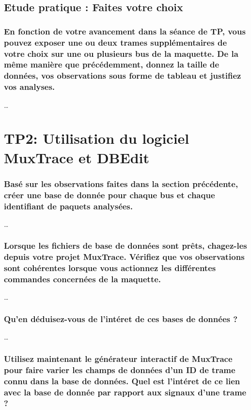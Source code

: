 \documentclass{rapportECC}
\begin{document}
\subsection{Etude pratique : Faites votre choix}

\subsubsection*{En fonction de votre avancement dans la séance de TP, vous pouvez exposer une ou deux trames supplémentaires de votre choix sur une ou plusieurs bus de la maquette. De la même manière que précédemment, donnez la taille de données, vos observations sous forme de tableau et justifiez vos analyses.}

\dots


\section{TP2: Utilisation du logiciel MuxTrace et DBEdit}

\subsubsection*{Basé sur les observations faites dans la section précédente, créer une base de donnée pour chaque bus et chaque identifiant de paquets analysées.}

\dots

\subsubsection*{Lorsque les fichiers de base de données sont prêts, chagez-les depuis votre projet MuxTrace. Vérifiez que vos observations sont cohérentes lorsque vous actionnez les différentes commandes concernées de la maquette.}

\dots

\subsubsection*{Qu'en déduisez-vous de l'intéret de ces bases de données ?}

\dots

\subsubsection*{Utilisez maintenant le générateur interactif de MuxTrace pour faire varier les champs de données d'un ID de trame connu dans la base de données. Quel est l'intéret de ce lien avec la base de donnée par rapport aux signaux d'une trame ?}
\end{document}
